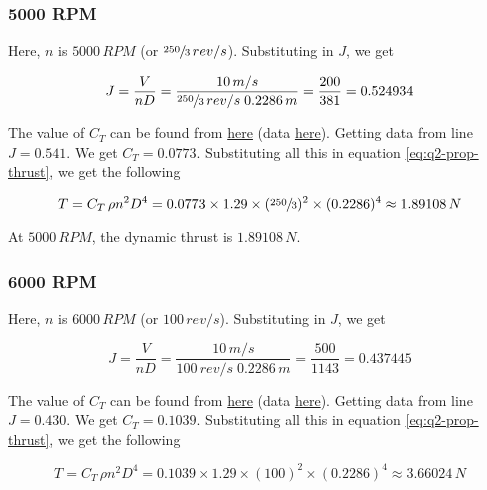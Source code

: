 \subsubsection*{5000 RPM}

Here, $n$ is $5000\,RPM$ (or $\sfrac{250}{3}\,rev/s$). Substituting in $J$, we get

\begin{equation*}
    J = \frac{V}{nD} = \frac{10\,m/s}{\sfrac{250}{3}\,rev/s \; 0.2286\,m} = \frac{200}{381} = 0.524934
\end{equation*}

The value of $C_T$ can be found from \href{https://m-selig.ae.illinois.edu/props/volume-1/plots/apcsf_9x6_ct.png}{here} (data \href{https://m-selig.ae.illinois.edu/props/volume-1/data/apcsf_9x6_kt0982_5006.txt}{here}). Getting data from line $J = 0.541$. We get $C_T = 0.0773$. Substituting all this in equation \ref{eq:q2-prop-thrust}, we get the following

\begin{equation*}
    T = C_T \, \rho n^2 D^4 = 0.0773 \times 1.29 \times (\sfrac{250}{3})^2 \times (0.2286)^4 \approx 1.89108\,N
\end{equation*}

At $5000\,RPM$, the dynamic thrust is $1.89108\,N$.

\subsubsection*{6000 RPM}

Here, $n$ is $6000\,RPM$ (or $100\,rev/s$). Substituting in $J$, we get

\begin{equation*}
    J = \frac{V}{nD} = \frac{10\,m/s}{100\,rev/s \; 0.2286\,m} = \frac{500}{1143} = 0.437445
\end{equation*}

The value of $C_T$ can be found from \href{https://m-selig.ae.illinois.edu/props/volume-1/plots/apcsf_9x6_ct.png}{here} (data \href{https://m-selig.ae.illinois.edu/props/volume-1/data/apcsf_9x6_kt0983_6017.txt}{here}). Getting data from line $J = 0.430$. We get $C_T = 0.1039$. Substituting all this in equation \ref{eq:q2-prop-thrust}, we get the following

\begin{equation*}
    T = C_T \, \rho n^2 D^4 = 0.1039 \times 1.29 \times (100)^2 \times (0.2286)^4 \approx 3.66024\,N
\end{equation*}

